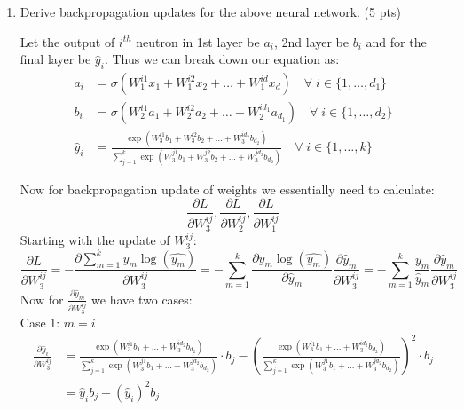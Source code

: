 \documentclass[a4paper]{article}
\theoremstyle{definition}
\newenvironment{soln}{
    \leavevmode\color{blue}\ignorespaces
}{}
\begin{document}
\begin{enumerate}
    \item Derive backpropagation updates for the above neural network. (5 pts)
    
    \begin{soln}
        Let the output of $i^{th}$ neutron in 1st layer be $a_i$, 2nd layer be $b_i$ and for the final layer be $\hat y_i$. Thus we can break down our equation as:
        \begin{align*}
            a_i &= \sigma(W_1^{i1}x_1 + W_1^{i2}x_2 + \ldots + W_1^{id}x_d) \quad \forall \; i \in \{1, \ldots, d_1\} \\
            b_i &= \sigma(W_2^{i1}a_1 + W_2^{i2}a_2 + \ldots + W_2^{id_1}a_{d_1}) \quad \forall \; i \in \{1, \ldots, d_2\} \\
            \hat y_i &= \frac{\exp{(W_3^{i1}b_1 + W_3^{i2}b_2 + \ldots + W_3^{id_2}b_{d_2})}}{\sum_{j=1}^{k}\exp{(W_3^{j1}b_1 + W_3^{j2}b_2 + \ldots + W_3^{jd_2}b_{d_2})}} \quad \forall \; i \in \{1, \ldots, k\} 
        \end{align*}

        Now for backpropagation update of weights we essentially need to calculate:
        $$
            \frac{\partial L}{\partial W_3^{ij}}, \frac{\partial L}{\partial W_2^{ij}}, \frac{\partial L}{\partial W_1^{ij}}
        $$
        Starting with the update of $W_3^{ij}$:
        $$
            \frac{\partial L}{\partial W_3^{ij}} = -\frac{\partial \sum_{m=1}^k y_m \log(\hat{y_m})}{\partial W_3^{ij}} = -\sum_{m=1}^k \frac{\partial y_m \log(\hat{y_m})}{\partial \hat y_m} \frac{\partial \hat y_m}{\partial W_3^{ij}} = -\sum_{m=1}^k \frac{y_m }{\hat y_m} \frac{\partial \hat y_m}{\partial W_3^{ij}}
        $$
        Now for $\frac{\partial \hat y_m}{\partial W_3^{ij}}$ we have two cases:\\
        Case 1: $m=i$
        \begin{align*}
            \frac{\partial \hat y_i}{\partial W_3^{ij}} &= \frac{\exp{(W_3^{i1}b_1 + \ldots + W_3^{id_2}b_{d_2})}}{\sum_{j=1}^{k}\exp{(W_3^{j1}b_1 + \ldots + W_3^{jd_2}b_{d_2})}}\cdot b_j - (\frac{\exp{(W_3^{i1}b_1 + \ldots + W_3^{id_2}b_{d_2})}}{\sum_{j=1}^{k}\exp{(W_3^{j1}b_1 + \ldots + W_3^{jd_2}b_{d_2})}})^2\cdot b_j \\
            &= \hat y_i b_j - (\hat y_i)^2 b_j
        \end{align*}


\end{soln}
\end{enumerate}
\end{document}
